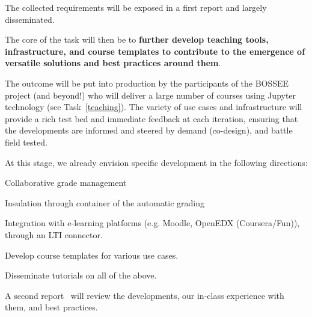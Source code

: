 \begin{task}[
  title={Teaching tools, infrastructure, and best practices},
  id=teaching-tools,
  lead=EP,
  PM=21, %
  wphases={0-36},
  partners={UPSUD}
]
  The collected requirements will be exposed in a first report
   and largely disseminated.

  The core of the task will then be to \textbf{further develop
    teaching tools, infrastructure, and course templates to contribute
    to the emergence of versatile solutions and best practices around
    them}.

  The outcome will be put into production by the participants of the
  BOSSEE project (and beyond!) who will deliver a large number of
  courses using Jupyter technology (see Task~\ref{teaching}). The variety of
  use cases and infrastructure will provide a rich test bed and
  immediate feedback at each iteration, ensuring that the developments
  are informed and steered by demand (co-design), and battle field
  tested.

  At this stage, we already envision specific development in the
  following directions:
  \begin{compactitem}
  \item Collaborative grade management
  \item Insulation through container of the automatic grading
  \item Integration with e-learning platforms (e.g. Moodle, OpenEDX
    (Coursera/Fun)), through an LTI connector.
  \item Develop course templates for various use cases.
  \item Disseminate tutorials on all of the above.
  \end{compactitem}

  A second report~ will review the
  developments, our in-class experience with them, and best practices.
\end{task}

